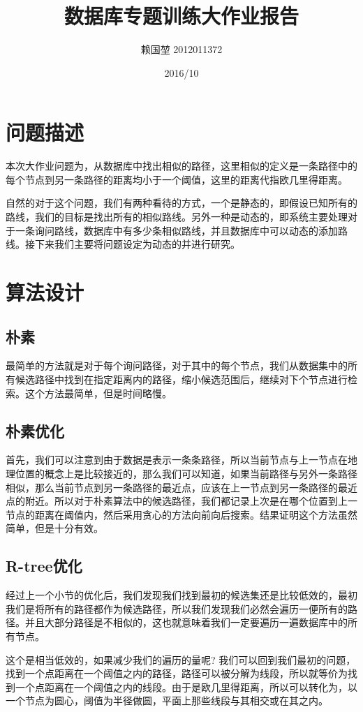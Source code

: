 \documentclass{article}
\title{数据库专题训练大作业报告}
\author{赖国堃 2012011372}
\date{2016/10}
\begin{document}
\maketitle
\section{问题描述}
本次大作业问题为，从数据库中找出相似的路径，这里相似的定义是一条路径中的每个节点到另一条路径的距离均小于一个阈值，这里的距离代指欧几里得距离。\par
自然的对于这个问题，我们有两种看待的方式，一个是静态的，即假设已知所有的路线，我们的目标是找出所有的相似路线。另外一种是动态的，即系统主要处理对于一条询问路线，数据库中有多少条相似路线，并且数据库中可以动态的添加路线。接下来我们主要将问题设定为动态的并进行研究。
\section{算法设计}
\subsection{朴素}
最简单的方法就是对于每个询问路径，对于其中的每个节点，我们从数据集中的所有候选路径中找到在指定距离内的路径，缩小候选范围后，继续对下个节点进行检索。这个方法最简单，但是时间略慢。
\subsection{朴素优化}
首先，我们可以注意到由于数据是表示一条条路径，所以当前节点与上一节点在地理位置的概念上是比较接近的，那么我们可以知道，如果当前路径与另外一条路径相似，那么当前节点到另一条路径的最近点，应该在上一节点到另一条路径的最近点的附近。所以对于朴素算法中的候选路径，我们都记录上次是在哪个位置到上一节点的距离在阈值内，然后采用贪心的方法向前向后搜索。结果证明这个方法虽然简单，但是十分有效。
\subsection{R-tree优化}
经过上一个小节的优化后，我们发现我们找到最初的候选集还是比较低效的，最初我们是将所有的路径都作为候选路径，所以我们发现我们必然会遍历一便所有的路径。并且大部分路径是不相似的，这也就意味着我们一定要遍历一遍数据库中的所有节点。\par

这个是相当低效的，如果减少我们的遍历的量呢? 我们可以回到我们最初的问题，找到一个点距离在一个阈值之内的路径，路径可以被分解为线段，所以就等价为找到一个点距离在一个阈值之内的线段。由于是欧几里得距离，所以可以转化为，以一个节点为圆心，阈值为半径做圆，平面上那些线段与其相交或在其之内。\par
\end{document}
